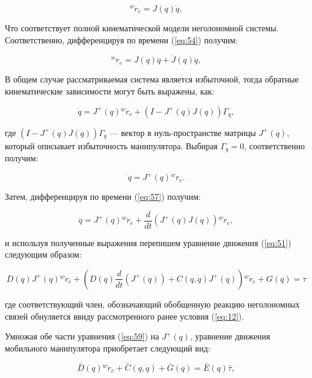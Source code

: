 \documentclass[14pt, a4paper]{extreport}
\begin{document}
\begin{equation}
{^w\dot{r}_e} = J(q)\dot{q},
\tag{54} \label{eq:54}
\end{equation}

Что соответствует полной кинематической модели неголономной системы. Соответственно, дифференцируя по времени (\ref{eq:54}) получим:

\begin{equation}
{^w\ddot{r}_e} = J(q)\ddot{q} + \dot{J}(q)\dot{q},
\tag{55} \label{eq:55}
\end{equation}

В общем случае рассматриваемая система является избыточной, тогда обратные кинематические зависимости могут быть выражены, как:

\begin{equation}
\dot{q} = J^{+}(q){^w\dot{r}_e} + (I - J^{+}(q)J(q))\Gamma_q,
\tag{56} \label{eq:56}
\end{equation}

\noindent
где $(I - J^{+}(q)J(q))\Gamma_q$ --- вектор в нуль-пространстве матрицы $J^{+}(q)$, который описывает избыточность манипулятора. Выбирая $\Gamma_q = 0$, соответственно получим:

\begin{equation}
\dot{q} = J^{+}(q){^w\dot{r}_e}.
\tag{57} \label{eq:57}
\end{equation}

Затем, дифференцируя по времени (\ref{eq:57}) получим:

\begin{equation}
\ddot{q} = J^{+}(q){^w\ddot{r}_e} + \dfrac{d}{dt}\left(J^{+}(q)J(q)\right){^w\dot{r}_e},
\tag{58} \label{eq:58}
\end{equation}

\noindent
и используя полученные выражения перепишем уравнение движения (\ref{eq:51}) следующим образом:

\[
    D(q)J^{+}(q){^w\ddot{r}_e} + \left(D(q)\dfrac{d}{dt}\left(J^{+}(q)\right) + C(q,\dot{q})J^{+}(q)\right){^w\dot{r}_e} + G(q) = \tau 
	\tag{59} \label{eq:59}
\]

\noindent
где соответствующий член, обозначающий обобщенную реакцию неголономных связей обнуляется ввиду рассмотренного ранее условия (\ref{eq:12}).

Умножая обе части уравнения (\ref{eq:59}) на $J^{+}(q)$, уравнение движения мобильного манипулятора приобретает следующий вид:

\[
    \bar{D}(q){^w\ddot{r}_e} + \bar{C}(q,\dot{q}) + \bar{G}(q) = \bar{E}(q)\bar{\tau}, 
	\tag{60} \label{eq:60}
\]
\end{document}
